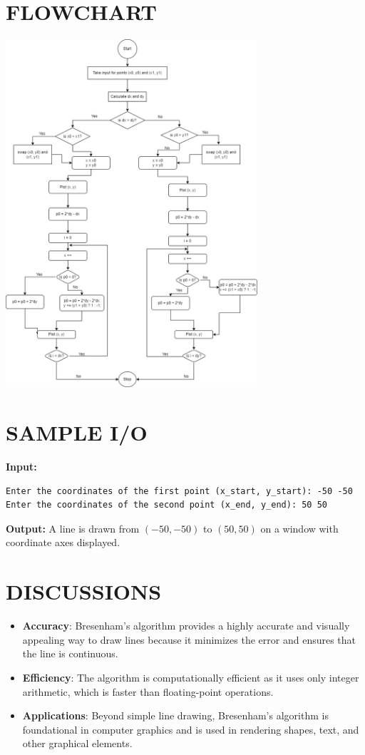 \documentclass{article}
\begin{document}
\section*{FLOWCHART}
\begin{center}
\includegraphics[width=0.7\textwidth]{flowchart.png}
\end{center}

\section*{SAMPLE I/O}
\textbf{Input:}
\begin{verbatim}
Enter the coordinates of the first point (x_start, y_start): -50 -50
Enter the coordinates of the second point (x_end, y_end): 50 50
\end{verbatim}

\textbf{Output:}
A line is drawn from $(-50, -50)$ to $(50, 50)$ on a window with coordinate axes displayed.

\section*{DISCUSSIONS}
\begin{itemize}
    \item \textbf{Accuracy}: Bresenham's algorithm provides a highly accurate and visually appealing way to draw lines because it minimizes the error and ensures that the line is continuous.
    \item \textbf{Efficiency}: The algorithm is computationally efficient as it uses only integer arithmetic, which is faster than floating-point operations.
    \item \textbf{Applications}: Beyond simple line drawing, Bresenham's algorithm is foundational in computer graphics and is used in rendering shapes, text, and other graphical elements.
\end{itemize}
\end{document}
